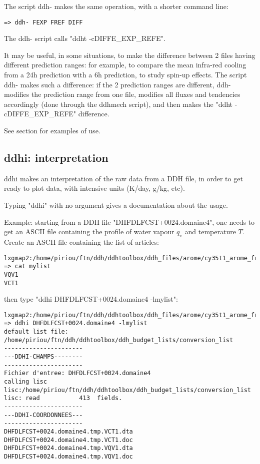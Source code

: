 \p The script ddh- makes the same operation, with a shorter command line:
{\begin{verbatim}
=> ddh- FEXP FREF DIFF
\end{verbatim}}
\noi The ddh- script calls "ddht -cDIFFE\_EXP\_REFE".

\p It may be useful, in some situations, to make the difference between 2 files having different prediction ranges: for example, to compare the mean infra-red cooling from a 24h prediction with a 6h prediction, to study spin-up effects. The script ddh- makes such a difference: if the 2 prediction ranges are different, ddh- modifies the prediction range from one file, modifies all fluxes and tendencies accordingly (done through the ddhmech script), and then makes the "ddht -cDIFFE\_EXP\_REFE" difference.

\p See section  for examples of use.

\subsection{ddhi: interpretation}

\p ddhi makes an interpretation of the raw data from a DDH file, in order to get
ready to plot data, with intensive units (K/day, g/kg, etc).

\p Typing "ddhi" with no argument gives a documentation about the usage.

\p Example: starting from a DDH file "DHFDLFCST+0024.domaine4", one needs to get an ASCII file containing
the profile of water vapour $q_v$ and temperature $T$.
    \noi Create an ASCII file containing the list of articles:
{\tiny \begin{verbatim}
lxgmap2:/home/piriou/ftn/ddh/ddhtoolbox/ddh_files/arome/cy35t1_arome_france_c744 => cat mylist 
VQV1
VCT1
\end{verbatim}}
\noi then type "ddhi DHFDLFCST+0024.domaine4 -lmylist":
{\tiny \begin{verbatim}
lxgmap2:/home/piriou/ftn/ddh/ddhtoolbox/ddh_files/arome/cy35t1_arome_france_c744 => ddhi DHFDLFCST+0024.domaine4 -lmylist
default list file:
/home/piriou/ftn/ddh/ddhtoolbox/ddh_budget_lists/conversion_list
----------------------
---DDHI-CHAMPS--------
----------------------
Fichier d'entree: DHFDLFCST+0024.domaine4
calling lisc
lisc:/home/piriou/ftn/ddh/ddhtoolbox/ddh_budget_lists/conversion_list
lisc: read           413  fields.
----------------------
---DDHI-COORDONNEES---
----------------------
DHFDLFCST+0024.domaine4.tmp.VCT1.dta
DHFDLFCST+0024.domaine4.tmp.VCT1.doc
DHFDLFCST+0024.domaine4.tmp.VQV1.dta
DHFDLFCST+0024.domaine4.tmp.VQV1.doc
\end{verbatim}}

